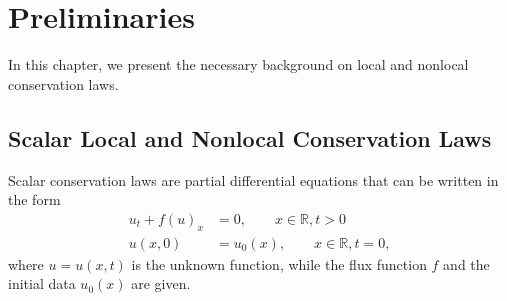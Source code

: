
\chapter{Preliminaries}\label{chap:chapter_2}
In this chapter, we present the necessary background on local and nonlocal conservation laws.
\section{Scalar Local and Nonlocal Conservation Laws}

Scalar conservation laws are partial differential equations that can be written in the form
\begin{equation}\label{eq:local model}
    \begin{split}
        u_{t} +  f(u)_{x} & = 0,     \qquad x \in \mathbb{R}, t > 0     \\
        u(x,0)            & = u_{0}(x), \qquad x \in \mathbb{R}, t = 0,
    \end{split}
\end{equation}
where $ u = u(x,t)$ is the unknown function, while the flux function $f$ and the initial data $u_{0}(x)$ are given.

